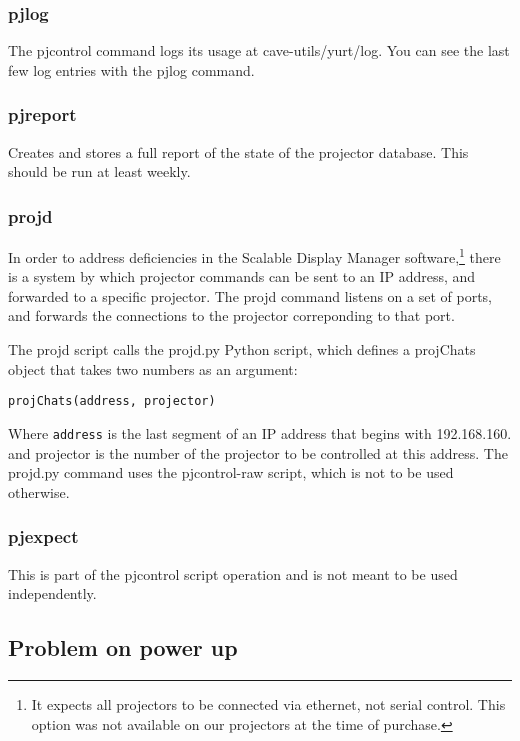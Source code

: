 \documentclass[11pt]{article}
\newcommand{\cmd}[1]{\texttt{#1}\xspace}
\begin{document}
\subsubsection{pjlog}

The pjcontrol command logs its usage at cave-utils/yurt/log.
You can see the last few log entries with the pjlog command.

\subsubsection{pjreport}

Creates and stores a full report of the state of the projector
database.  This should be run at least weekly.

\subsubsection{projd}

In order to address deficiencies in the Scalable Display Manager
software,\footnote{It expects all projectors to be connected via
  ethernet, not serial control.  This option was not available on our
  projectors at the time of purchase.} there is a system by which
projector commands can be sent to an IP address, and forwarded to a
specific projector.  The projd command listens on a set of ports, and
forwards the connections to the projector correponding to that port.

The projd script calls the projd.py Python script, which defines a
projChats object that takes two numbers as an argument:

\begin{verbatim}
projChats(address, projector)
\end{verbatim}

Where \cmd{address} is the last segment of an IP address that begins
with 192.168.160. and projector is the number of the projector to be
controlled at this address.  The projd.py command uses the
pjcontrol-raw script, which is not to be used otherwise.

\subsubsection{pjexpect}

This is part of the pjcontrol script operation and is not meant to be
used independently.

\subsection{Problem on power up}
\end{document}
